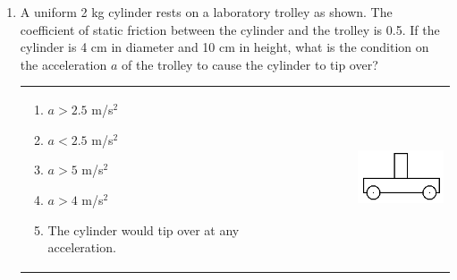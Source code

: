 \documentclass[12pt,letterpaper]{article}
\begin{document}
\begin{enumerate}[resume]
\item
A uniform 2 kg cylinder rests on a laboratory trolley as shown. The coefficient of static friction between the cylinder and the trolley is 0.5. If the cylinder is 4 cm in diameter and 10 cm in height, what is the condition on the acceleration $a$ of the trolley to cause the cylinder to tip over?

\begin{tabular}{l r}

\begin{minipage}{0.6\textwidth}
\begin{enumerate}
\item $a > 2.5$ m/s$^2$
\item $a < 2.5$ m/s$^2$
\item $a > 5$ m/s$^2$
\item $a > 4$ m/s$^2$
\item The cylinder would tip over at any acceleration.
\end{enumerate}
\end{minipage} &
\begin{minipage}{0.4\textwidth}
\includegraphics[width=0.65\textwidth,center]{trolley.png}
\end{minipage}
\end{tabular}



\end{enumerate}
\end{document}
